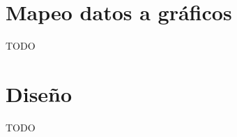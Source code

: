 \documentclass[letterpaper,10pt]{article}
\begin{document}
	\section{Mapeo datos a gráficos}

	TODO

	\newpage

	\section{Diseño}

	TODO
\end{document}
